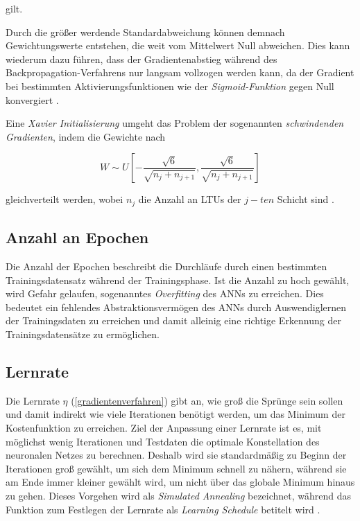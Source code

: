 gilt.

Durch die größer werdende Standardabweichung können demnach Gewichtungswerte entstehen, die weit vom Mittelwert Null abweichen. Dies kann wiederum dazu führen, dass der Gradientenabstieg während des Backpropagation-Verfahrens nur langsam vollzogen werden kann, da der Gradient bei bestimmten Aktivierungsfunktionen wie der \textit{Sigmoid-Funktion} gegen Null konvergiert \cite{AurelienGeron.2018}. 

Eine \textit{Xavier Initialisierung} umgeht das Problem der sogenannten \textit{schwindenden Gradienten}, indem die Gewichte nach

\begin{equation} \label{xavier}
W \sim U[-\frac{\sqrt{6}}{\sqrt{n_{j} + n_{j+1}}},\frac{\sqrt{6}}{\sqrt{n_{j} + n_{j+1}}}]
\end{equation}

gleichverteilt werden, wobei $n_{j}$ die Anzahl an LTUs der $j-ten$ Schicht sind \cite{XavierGlorot.2010}.

\subsection*{Anzahl an Epochen}

Die Anzahl der Epochen beschreibt die Durchläufe durch einen bestimmten Trainingsdatensatz während der Trainingsphase. Ist die Anzahl zu hoch gewählt, wird Gefahr gelaufen, sogenanntes \textit{Overfitting} des ANNs zu erreichen. Dies bedeutet ein fehlendes Abstraktionsvermögen des ANNs durch Auswendiglernen der Trainingsdaten zu erreichen und damit alleinig eine richtige Erkennung der Trainingsdatensätze zu ermöglichen.  

\subsection*{Lernrate}

Die Lernrate $\eta$ (\ref{gradientenverfahren}) gibt an, wie groß die Sprünge sein sollen und damit indirekt wie viele Iterationen benötigt werden, um das Minimum der Kostenfunktion zu erreichen. Ziel der Anpassung einer Lernrate ist es, mit möglichst wenig Iterationen und Testdaten die optimale Konstellation des neuronalen Netzes zu berechnen. Deshalb wird sie standardmäßig zu Beginn der Iterationen groß gewählt, um sich dem Minimum schnell zu nähern, während sie am Ende immer kleiner gewählt wird, um nicht über das globale Minimum hinaus zu gehen. Dieses Vorgehen wird als \textit{Simulated Annealing} bezeichnet, während das Funktion zum Festlegen der Lernrate als \textit{Learning Schedule} betitelt wird \cite{AurelienGeron.2018}.

